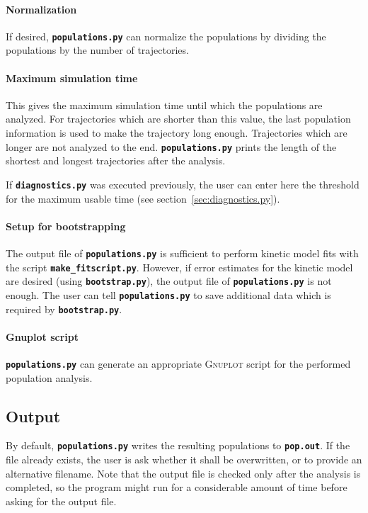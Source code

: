 \documentclass[a4paper,10pt,DIV=15,openany,twoside=false]{scrbook}
\newcommand{\ttt}[1]{\textbf{\texttt{#1}}}
\begin{document}
\paragraph{Normalization}

If desired, \ttt{populations.py} can normalize the populations by dividing the populations by the number of trajectories. 

\paragraph{Maximum simulation time}

This gives the maximum simulation time until which the populations are analyzed. For trajectories which are shorter than this value, the last population information is used to make the trajectory long enough. Trajectories which are longer are not analyzed to the end. \ttt{populations.py} prints the length of the shortest and longest trajectories after the analysis.

If \ttt{diagnostics.py} was executed previously, the user can enter here the threshold for the maximum usable time (see section~\ref{sec:diagnostics.py}).

\paragraph{Setup for bootstrapping}

The output file of \ttt{populations.py} is sufficient to perform kinetic model fits with the script \ttt{make\_fitscript.py}.
However, if error estimates for the kinetic model are desired (using \ttt{bootstrap.py}), the output file of \ttt{populations.py} is not enough.
The user can tell \ttt{populations.py} to save additional data which is required by \ttt{bootstrap.py}.

\paragraph{Gnuplot script}

\ttt{populations.py} can generate an appropriate \textsc{Gnuplot} script for the performed population analysis. 

\subsection{Output}

By default, \ttt{populations.py} writes the resulting populations to \ttt{pop.out}. If the file already exists, the user is ask whether it shall be overwritten, or to provide an alternative filename. Note that the output file is checked only after the analysis is completed, so the program might run for a considerable amount of time before asking for the output file.
\end{document}

